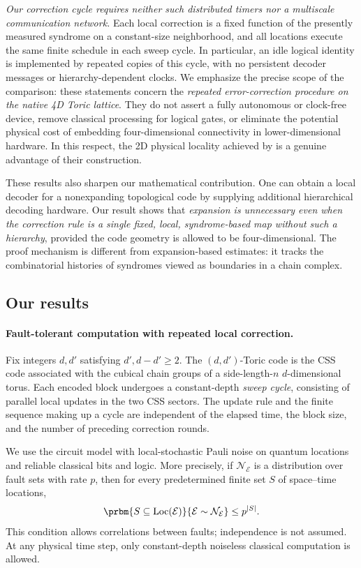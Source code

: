 \emph{Our correction cycle requires neither such distributed timers nor a multiscale communication network.} Each local correction is a fixed function of the presently measured syndrome on a constant-size neighborhood, and all locations execute the same finite schedule in each sweep cycle. In particular, an idle logical identity is implemented by repeated copies of this cycle, with no persistent decoder messages or hierarchy-dependent clocks. We emphasize the precise scope of the comparison: these statements concern the \emph{repeated error-correction procedure on the native 4D Toric lattice}. They do not assert a fully autonomous or clock-free device, remove classical processing for logical gates, or eliminate the potential physical cost of embedding four-dimensional connectivity in lower-dimensional hardware. In this respect, the 2D physical locality achieved by \cite{SelubBhardwajLake2026} is a genuine advantage of their construction.

These results also sharpen our mathematical contribution. One can obtain a local decoder for a nonexpanding topological code by supplying additional hierarchical decoding hardware. Our result shows that \emph{expansion is unnecessary even when the correction rule is a single fixed, local, syndrome-based map without such a hierarchy}, provided the code geometry is allowed to be four-dimensional. The proof mechanism is different from expansion-based estimates: it tracks the combinatorial histories of syndromes viewed as boundaries in a chain complex.

\subsection{Our results}

\paragraph{Fault-tolerant computation with repeated local correction.}
Fix integers $d,d'$ satisfying $d',d-d'\geq 2$. The $(d,d')$-Toric code is the CSS code associated with the cubical chain groups of a side-length-$n$ $d$-dimensional torus. Each encoded block undergoes a constant-depth \emph{sweep cycle}, consisting of parallel local updates in the two CSS sectors. The update rule and the finite sequence making up a cycle are independent of the elapsed time, the block size, and the number of preceding correction rounds.

We use the circuit model with local-stochastic Pauli noise on quantum locations and reliable classical bits and logic. More precisely, if $\mathcal N_{\mathcal E}$ is a distribution over fault sets with rate $p$, then for every predetermined finite set $S$ of space--time locations,
\begin{equation*}
   \prbm{S\subseteq\operatorname{Loc}(\mathcal E)}{\mathcal E\sim\mathcal N_{\mathcal E}}\leq p^{|S|}.
\end{equation*}
This condition allows correlations between faults; independence is not assumed. At any physical time step, only constant-depth noiseless classical computation is allowed.


